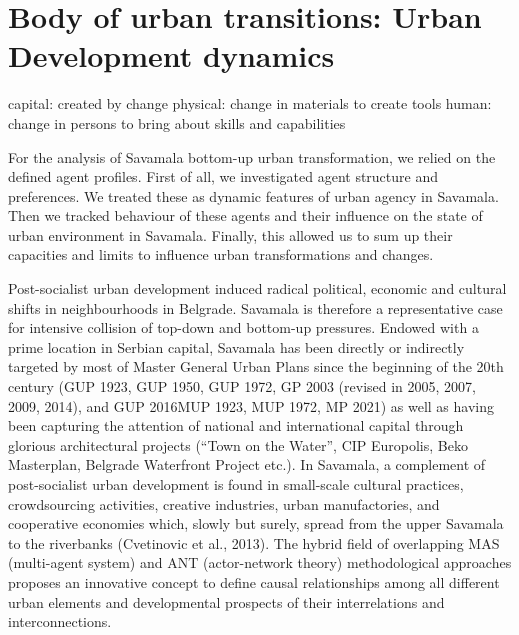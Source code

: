 \documentclass[11pt]{report}
\begin{document}
\section{Body of urban transitions: Urban Development dynamics}

\cite{COleman 1988}
capital: created by change
    physical: change in materials to create tools
    human: change in persons to bring about skills and capabilities

For the analysis of Savamala bottom-up urban transformation, we relied on the defined agent profiles. First of all, we investigated agent structure and preferences. We treated these as dynamic features of urban agency in Savamala. Then we tracked behaviour of these agents and their influence on the state of urban environment in Savamala. Finally, this allowed us to sum up their capacities and limits to influence urban transformations and changes.

Post-socialist urban development induced radical political, economic and cultural shifts in neighbourhoods in Belgrade. Savamala is therefore a representative case for intensive collision of top-down and bottom-up pressures. Endowed with a prime location in Serbian capital, Savamala has been directly or indirectly targeted by most of Master General Urban Plans since the beginning of the 20th century (GUP 1923, GUP 1950, GUP 1972, GP 2003 (revised in 2005, 2007, 2009, 2014), and GUP 2016MUP 1923, MUP 1972, MP 2021) as well as having been capturing the attention of national and international capital through glorious architectural projects (“Town on the Water”, CIP Europolis, Beko Masterplan, Belgrade Waterfront Project etc.). In Savamala, a complement of post-socialist urban development is found in small-scale cultural practices, crowdsourcing activities, creative industries, urban manufactories, and cooperative economies which, slowly but surely, spread from the upper Savamala to the riverbanks (Cvetinovic et al., 2013). The hybrid field of overlapping MAS (multi-agent system) and ANT (actor-network theory) methodological approaches proposes an innovative concept to define causal relationships among all different urban elements and developmental prospects of their interrelations and interconnections.
\end{document}
